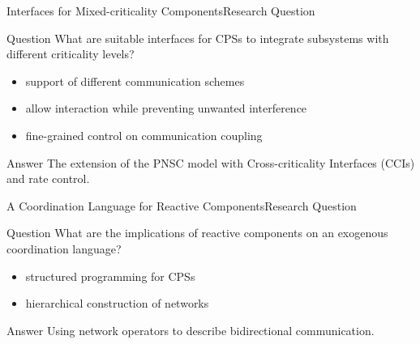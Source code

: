 \documentclass{beamer}
\begin{document}
\begin{frame}{Interfaces for Mixed-criticality Components}{Research Question}
    \begin{block}{Question}
        What are suitable interfaces for CPSs to integrate subsystems with different criticality levels?
    \end{block}
    \begin{itemize}
        \item support of different communication schemes
        \item allow interaction while preventing unwanted interference
        \item fine-grained control on communication coupling
    \end{itemize}
    \begin{exampleblock}{Answer}
        The extension of the PNSC model with Cross-criticality Interfaces (CCIs) and rate control.
    \end{exampleblock}
\end{frame}
\begin{frame}{A Coordination Language for Reactive Components}{Research Question}
    \begin{block}{Question}
        What are the implications of reactive components on an exogenous coordination language?
    \end{block}
    \begin{itemize}
        \item structured programming for CPSs
        \item hierarchical construction of networks
    \end{itemize}
    \begin{exampleblock}{Answer}
        Using network operators to describe bidirectional communication.
    \end{exampleblock}
\end{frame}



%     
%     
\end{document}
